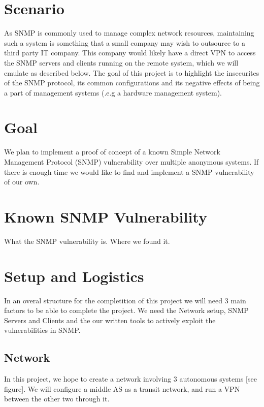 \documentclass[pdftex, 11pt]{article}
\begin{document}


\pagebreak

\setcounter{secnumdepth}{2}

\section{Scenario}
As SNMP is commonly used to manage complex network resources, maintaining 
such a system is something that a small company may wish to outsource to a 
third party IT company.  This company would likely have a direct VPN to 
access the SNMP servers and clients running on the remote system, which we 
will emulate as described below. The goal of this project is to highlight 
the insecurites of the SNMP protocol, its common configurations and its 
negative effects of being a part of management systems 
(.e.g a hardware management system).

\section{Goal}
We plan to implement a proof of concept of a known  Simple Network Management 
Protocol (SNMP) vulnerability over multiple anonymous systems. If there is enough time
we would like to find and implement a SNMP vulnerability of our own.

\section{Known SNMP Vulnerability} %
What the SNMP vulnerability is. 
Where we found it.

\section{Setup and Logistics}
In an overal structure for the completition of this project
we will need 3 main factors to be able to complete the project.
We need the Network setup, SNMP Servers and Clients and the
our written tools to actively exploit the vulnerabilities in
SNMP.

\subsection{Network}
In this project, we hope to create a network involving 3 autonomous 
systems [see figure].  We will configure a middle AS as a transit   %
network, and run a VPN between the other two through it.
\end{document}
